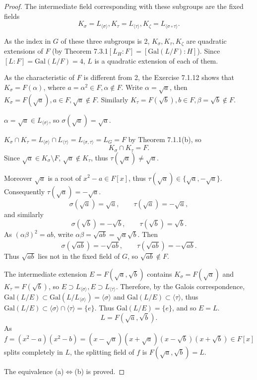 \documentclass[11pt,a4paper]{article}
\newcommand{\Gal}{\mathrm{Gal}}
\begin{document}
\begin{proof}
\bigskip

The intermediate field corresponding with these subgroups are the fixed fields $$K_\sigma = L_{\langle \sigma\rangle},K_\tau=L_{\langle \tau\rangle},K_\zeta = L_{\langle\sigma \circ \tau\rangle}.$$

As the index in $G$ of these three subgroups is 2, $K_\sigma,K_\tau,K_\zeta $ are quadratic extensions of $F$ (by Theorem 7.3.1$[L_H:F] = [\Gal(L/F) : H]$). Since $[L:F] = \Gal(L/F) = 4$, $L$ is a quadratic extension of each of them.

As the characteristic of $F$ is different from 2, the Exercise 7.1.12 shows that $K_\sigma = F(\alpha)$, where $a=\alpha^2 \in F,\alpha \not \in F$. Write $\alpha = \sqrt{a}$, then $K_\sigma = F(\sqrt{a}),a\in F,\sqrt{a} \not \in F$. Similarly $K_\tau = F(\sqrt{b}), b \in F,\beta = \sqrt{b} \not \in F$.

$\alpha = \sqrt{a} \in L_{\langle \sigma \rangle}$, so $\sigma(\sqrt{a}) = \sqrt{a}$.

$K_\sigma \cap K_\tau =L_{\langle \sigma\rangle} \cap L_{\langle \tau\rangle} = L_{\langle \sigma, \tau\rangle} = L_G = F$ by Theorem 7.1.1(b), so
$$K_\sigma \cap K_\tau = F.$$
Since $\sqrt{a} \in K_\sigma \setminus F$, $\sqrt{a} \not \in K_\tau$, thus $\tau(\sqrt{a}) \neq \sqrt{a}$.

Moreover $\sqrt{a}$ is a root of $x^2 -a \in F[x]$, thus $\tau(\sqrt{a}) \in \{\sqrt{a}, - \sqrt{a}\}$. Consequently $\tau(\sqrt{a}) = -\sqrt{a}$.
$$\sigma(\sqrt{a}) = \sqrt{a}, \qquad \tau(\sqrt{a}) = - \sqrt{a},$$
and similarly$$\sigma(\sqrt{b}) = -\sqrt{b}, \qquad \tau(\sqrt{b}) = \sqrt{b}.$$
As $(\alpha \beta)^2 = ab$, write $\alpha \beta = \sqrt{ab} = \sqrt{a} \sqrt{b}$. Then
$$\sigma(\sqrt{ab}) = -\sqrt{ab}, \qquad \tau(\sqrt{ab}) = -\sqrt{ab}.$$
Thus $\sqrt{ab}$ lies not in the fixed field of $G$, so $\sqrt{ab} \not \in F$.

The intermediate extension $E = F(\sqrt{a},\sqrt{b})$ contains $K_\sigma = F(\sqrt{a})$ and $K_\tau = F(\sqrt{b})$, so  $E \supset L_{\langle \sigma\rangle}, E \supset L_{\langle \tau\rangle}$. Therefore, by the Galois correspondence, $\Gal(L/E) \subset \Gal(L/ L_{\langle \sigma\rangle}) = \langle \sigma\rangle$ and $\Gal(L/E) \subset \langle \tau\rangle$, thus $\Gal(L/E) \subset \langle \sigma \rangle \cap \langle\tau\rangle = \{e\}$. Thus $\Gal(L/E) = \{e\}$, and so $E = L$.
$$L = F(\sqrt{a}, \sqrt{b}).$$
As $f =(x^2-a)(x^2-b) = (x-\sqrt{a})(x+\sqrt{a})(x-\sqrt{b})(x+\sqrt{b}) \in F[x]$ splits completely in $L$, the splitting field of $f$ is $F(\sqrt{a},\sqrt{b}) =L$.

The equivalence (a)$\iff$(b) is proved.
\end{proof}
\end{document}

